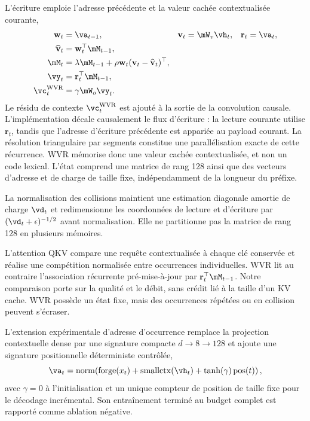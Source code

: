 L'écriture emploie l'adresse précédente et la valeur cachée contextualisée courante,
\begin{align}
    \mathbf{w}_t &= \va_{t-1}, & \mathbf{v}_t &= \mW_v\vh_t, & \mathbf{r}_t &= \va_t,\\
    \widehat{\mathbf{v}}_t &= \mathbf{w}_t^\top\mM_{t-1},\\
    \mM_t &= \lambda\mM_{t-1}+\rho\mathbf{w}_t
        (\mathbf{v}_t-\widehat{\mathbf{v}}_t)^\top,\\
    \vy_t &= \mathbf{r}_t^\top\mM_{t-1},\\
    \vc^{\mathrm{WVR}}_t &= \gamma\mW_o\vy_t.
\end{align}
Le résidu de contexte $\vc^{\mathrm{WVR}}_t$ est ajouté à la sortie de la convolution causale. L'implémentation décale causalement le flux d'écriture : la lecture courante utilise $\mathbf{r}_t$, tandis que l'adresse d'écriture précédente est appariée au payload courant. La résolution triangulaire par segments constitue une parallélisation exacte de cette récurrence. WVR mémorise donc une valeur cachée contextualisée, et non un code lexical. L'état comprend une matrice de rang 128 ainsi que des vecteurs d'adresse et de charge de taille fixe, indépendamment de la longueur du préfixe.

La normalisation des collisions maintient une estimation diagonale amortie de charge $\vd_t$ et redimensionne les coordonnées de lecture et d'écriture par $(\vd_t+\epsilon)^{-1/2}$ avant normalisation. Elle ne partitionne pas la matrice de rang 128 en plusieurs mémoires.

L'attention QKV compare une requête contextualisée à chaque clé conservée et réalise une compétition normalisée entre occurrences individuelles. WVR lit au contraire l'association récurrente pré-mise-à-jour par $\mathbf{r}_t^\top\mM_{t-1}$. Notre comparaison porte sur la qualité et le débit, sans crédit lié à la taille d'un KV cache. WVR possède un état fixe, mais des occurrences répétées ou en collision peuvent s'écraser.

L'extension expérimentale d'adresse d'occurrence remplace la projection contextuelle dense par une signature compacte $d\rightarrow8\rightarrow128$ et ajoute une signature positionnelle déterministe contrôlée,
\begin{equation}
    \va_t=\operatorname{norm}\!\left(
    \operatorname{forge}(x_t)+\operatorname{smallctx}(\vh_t)
    +\tanh(\gamma)\operatorname{pos}(t)\right),
\end{equation}
avec $\gamma=0$ à l'initialisation et un unique compteur de position de taille fixe pour le décodage incrémental. Son entraînement terminé au budget complet est rapporté comme ablation négative.

